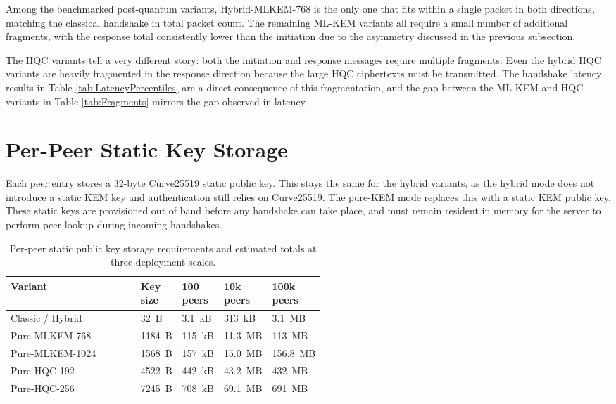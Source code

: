Among the benchmarked post-quantum variants, Hybrid-MLKEM-768 is the only one that fits within a single packet in both directions, matching the classical handshake in total packet count. The remaining ML-KEM variants all require a small number of additional fragments, with the response total consistently lower than the initiation due to the asymmetry discussed in the previous subsection. 

The HQC variants tell a very different story: both the initiation and response messages require multiple fragments. Even the hybrid HQC variants are heavily fragmented in the response direction because the large HQC ciphertexts must be transmitted. The handshake latency results in Table \ref{tab:LatencyPercentiles} are a direct consequence of this fragmentation, and the gap between the ML-KEM and HQC variants in Table \ref{tab:Fragments} mirrors the gap observed in latency.

\newpage
\section{Per-Peer Static Key Storage}\label{sec:results-peermemory}
Each peer entry stores a 32-byte Curve25519 static public key. This stays the same for the hybrid variants, as the hybrid mode does not introduce a static KEM key and authentication still relies on Curve25519. The pure-KEM mode replaces this with a static KEM public key. These static keys are provisioned out of band before any handshake can take place, and must remain resident in memory for the server to perform peer lookup during incoming handshakes.

\begin{table}[H]
\centering
\begin{tabular}{|l|R{0.13\linewidth}R{0.13\linewidth}R{0.13\linewidth}R{0.13\linewidth}|}
\hline
\textbf{Variant} & Key size & 100 peers & 10k peers & 100k peers \\
\hline
Classic / Hybrid  & \qty{32}{B}   & \qty{3.1}{kB}  & \qty{313}{kB}   & \qty{3.1}{MB}  \\
Pure-MLKEM-768    & \qty{1184}{B} & \qty{115}{kB}  & \qty{11.3}{MB}  & \qty{113}{MB}   \\
Pure-MLKEM-1024   & \qty{1568}{B} & \qty{157}{kB}  & \qty{15.0}{MB}  & \qty{156.8}{MB}   \\
Pure-HQC-192      & \qty{4522}{B} & \qty{442}{kB}  & \qty{43.2}{MB}  & \qty{432}{MB}   \\
Pure-HQC-256      & \qty{7245}{B} & \qty{708}{kB}  & \qty{69.1}{MB}  & \qty{691}{MB}   \\
\hline
\end{tabular}
\caption{Per-peer static public key storage requirements and estimated totals at three deployment scales.}
\label{tab:StaticStorage}
\end{table}

